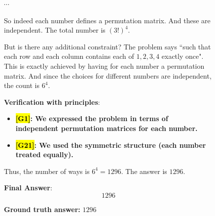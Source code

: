 \documentclass{article}
\theoremstyle{plain}
\theoremstyle{definition}
\theoremstyle{remark}
\begin{document}
\begin{figure}[!tb]
\begin{runcard}[title={Example of How E-SPL Shapes Model Behavior}]
\begin{runbox}[title={Model Output}]
$\cdots$

So indeed each number defines a permutation matrix. And these are independent. The total number is \((3!)^4\).

\medskip

But is there any additional constraint? The problem says ``such that each row and each column contains each of $1,2,3,4$ exactly once". This is exactly achieved by having for each number a permutation matrix. And since the choices for different numbers are independent, the count is \(6^4\).

\medskip

{\color{Brown}\textbf{Verification with principles}}:
\begin{itemize}
    \item \textbf{\color{Brown}\hl{{[G1]}}: We expressed the problem in terms of independent permutation matrices for each number.}
    \item \textbf{\color{Brown}\hl{{[G21]}}: We used the symmetric structure (each number treated equally).}
\end{itemize}

Thus, the number of ways is \(6^4 = 1296\). The answer is \(1296\).

\medskip
\textbf{Final Answer}:
\[
\boxed{1296}
\]

\end{runbox}

\textbf{Ground truth answer:} $1296$
\end{runcard}
\label{fig:example-e-spl-3}

\end{figure}
\end{document}
